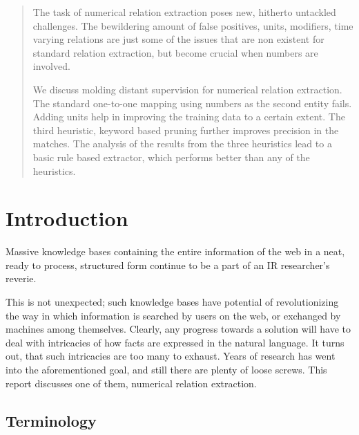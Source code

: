 \documentclass[a4paper,10pt]{article}
\begin{document}
\newpage
\maketitle
\tableofcontents
\begin{abstract}
The task of numerical relation extraction poses new, hitherto untackled challenges. The bewildering amount of false positives, units, 
modifiers, time varying relations are just some of the issues that are non existent for standard relation extraction, but become 
crucial when numbers are involved.

We discuss molding distant supervision for numerical relation extraction. The standard one-to-one mapping using numbers as the second entity 
fails. Adding units help in improving the training data to a certain extent. The third heuristic, keyword based pruning further improves 
precision in the matches.
The analysis of the results from the three heuristics lead to a basic rule based extractor, which performs better than any of the heuristics.

\end{abstract}

\section{Introduction}
Massive knowledge bases containing the entire information of the web in a neat, ready to process, structured form continue to be a part of an IR researcher's reverie.


This is not unexpected; such knowledge bases have potential of revolutionizing the way in which information is searched by users on the web, or exchanged by machines among
themselves. 
Clearly, any progress towards a solution will have to deal with intricacies of how facts are expressed in the natural language.
It turns out, that such intricacies are too many to exhaust. Years of research has went into the aforementioned goal, and still
there are plenty of loose screws. This report discusses one of them, numerical relation extraction.



\subsection{Terminology}
\end{document}
